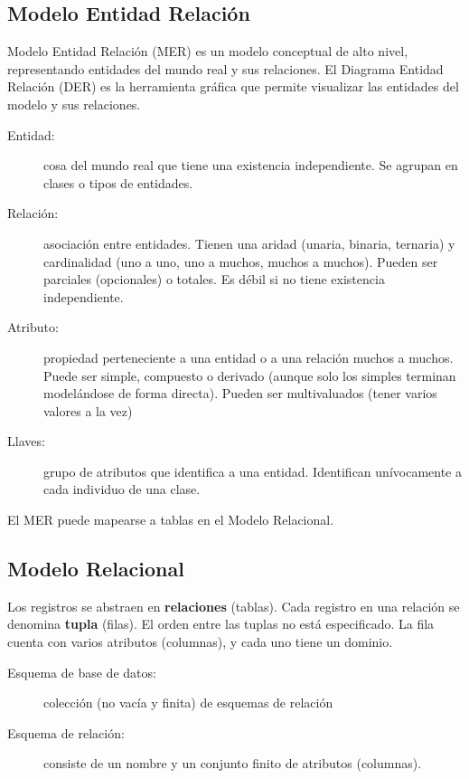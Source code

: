 \subsection{Modelo Entidad Relación}

Modelo Entidad Relación (MER) es un modelo conceptual de alto nivel, representando entidades del mundo real y sus relaciones. El Diagrama Entidad Relación (DER) es la herramienta gráfica que permite visualizar las entidades del modelo y sus relaciones.

\begin{description}
	\item[Entidad:] cosa del mundo real que tiene una existencia independiente. Se agrupan en clases o tipos de entidades.
	\item[Relación:] asociación entre entidades. Tienen una aridad (unaria, binaria, ternaria) y cardinalidad (uno a uno, uno a muchos, muchos a muchos). Pueden ser parciales (opcionales) o totales. Es débil si no tiene existencia independiente.
	\item[Atributo:] propiedad perteneciente a una entidad o a una relación muchos a muchos. Puede ser simple, compuesto o derivado (aunque solo los simples terminan modelándose de forma directa). Pueden ser multivaluados (tener varios valores a la vez)
	\item[Llaves:] grupo de atributos que identifica a una entidad. Identifican unívocamente a cada individuo de una clase.
\end{description}

El MER puede mapearse a tablas en el Modelo Relacional.

\subsection{Modelo Relacional}

Los registros se abstraen en \textbf{relaciones} (tablas). Cada registro en una relación se denomina \textbf{tupla} (filas). El orden entre las tuplas no está especificado. La fila cuenta con varios atributos (columnas), y cada uno tiene un dominio.

\begin{description}
	\item[Esquema de base de datos:] colección (no vacía y finita) de esquemas de relación
	\item[Esquema de relación:] consiste de un nombre y un conjunto finito de atributos (columnas).
\end{description}

